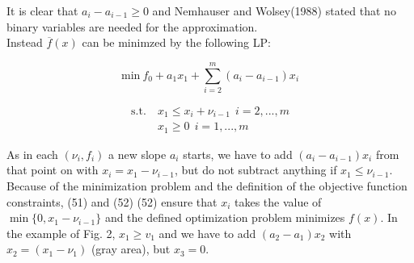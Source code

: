 \documentclass[a4paper, 12pt]{article}
\begin{document}
It is clear that $a_{i}-a_{i-1}\geq0$ and Nemhauser and Wolsey(1988) stated that no binary variables are needed for the approximation.\\
Instead $\overline{f}(x)$ can be minimzed by the following LP:
\begin{large}
\begin{equation*}
\mathrm{min}\ f_{0}+a_{1}x_{1}+\sum_{i=2}^m\left(a_{i}-a_{i-1}\right)x_{i}
\end{equation*}
\end{large}
\begin{large}
\begin{align*}
\mathrm{s.t.}\ &x_{1}\leq x_{i}+\nu_{i-1}\ \ i=2,...,m \\
&x_{1}\geq0\ \ i=1,...,m
\end{align*}
\end{large}
As in each $\left(\nu_{i},f_{i}\right)$ a new slope $a_i$ starts, we have to add $\left(a_i-a_{i-1}\right)x_{i}$ from that point on with $x_{i}=x_{1}-\nu_{i-1}$, but do not subtract anything if $x_{1} \le \nu_{i-1}$. Because of the minimization problem and the definition of the objective function constraints, (51) and (52) (52) ensure that $x_{i}$ takes the value of $\min\{0,x_{1}-\nu_{i-1}\}$ and the defined optimization problem minimizes $f(x)$. In the example of Fig. 2, $x_1 \ge v_1$ and we have to add $\left(a_2 - a_1\right)x_2$ with $x_2=\left(x_1-\nu_1\right)$ (gray area), but $x_3=0$.
\end{document}
